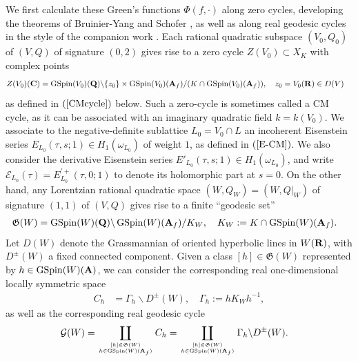 \documentclass{amsart}
\theoremstyle{definition}
\theoremstyle{definition}
\theoremstyle{definition}
\begin{document}
We first calculate these Green's functions $\Phi(f, \cdot)$ along zero cycles, developing the theorems of Bruinier-Yang \cite[Theorem 4.7]{BY} and Schofer \cite{Sch}, 
as well as along real geodesic cycles in the style of the companion work \cite{VO}. 
Each rational quadratic subspace $(V_0, Q_0)$ of $(V,Q)$ of signature $(0, 2)$ gives rise to a zero cycle $Z(V_0) \subset X_K$ with complex points
\begin{align*} Z(V_0)({\bf{C}}) &= \operatorname{GSpin}(V_0)({\bf{Q}}) \backslash \lbrace z_0 \rbrace \times
\operatorname{GSpin}(V_0)({\bf{A}}_f) / (K \cap \operatorname{GSpin}(V_0)({\bf{A}}_f)), \quad z_0 = V_0({\bf{R}}) \in D(V) \end{align*} 
as defined in $(\ref{CMcycle})$ below. Such a zero-cycle is sometimes called a CM cycle, as it can be associated with an imaginary quadratic field $k = k(V_0)$. 
We associate to the negative-definite sublattice $L_0 = V_0 \cap L$ an incoherent Eisenstein series $E_{L_0}(\tau, s; 1) \in H_1(\omega_{L_0})$ of weight $1$, as defined in $(\ref{E-CM})$. 
We also consider the derivative Eisenstein series $E'_{L_0}(\tau, s; 1) \in H_1(\omega_{L_0})$, and write
$\mathcal{E}_{L_0}(\tau) = E^{\prime +}_{L_0}(\tau, 0; 1)$ to denote its holomorphic part at $s=0$.
On the other hand, any Lorentzian rational quadratic space $(W, Q_W) = (W, Q\vert_W)$ of signature $(1,1)$ of $(V,Q)$ gives rise to a finite ``geodesic set'' 
\begin{align*} \mathfrak{G}(W) &= \operatorname{GSpin}(W)({\bf{Q}}) \backslash \operatorname{GSpin}(W)({\bf{A}}_f)/ K_W, \quad K_W :=K \cap \operatorname{GSpin}(W)({\bf{A}}_f). \end{align*}
Let $D(W)$ denote the Grassmannian of oriented hyperbolic lines in $W({\bf{R}})$, with $D^{\pm}(W)$ a fixed connected component.
Given a class $[h] \in \mathfrak{G}(W)$ represented by 
$h \in \operatorname{GSpin}(W)({\bf{A}})$, we can consider the corresponding real one-dimensional locally symmetric space
\begin{align*} C_h &= \Gamma_{h} \backslash D^{\pm}(W), \quad \Gamma_h := h K_W h^{-1}, \end{align*} %
as well as the corresponding real geodesic cycle 
\begin{align*} \mathcal{G}(W) &= \coprod\limits_{ [h] \in \mathfrak{G}(W) \atop h \in \operatorname{GSpin}(W)({\bf{A}}_f) } C_h 
= \coprod\limits_{ [h] \in \mathfrak{G}(W) \atop h \in \operatorname{GSpin}(W)({\bf{A}}_f) } \Gamma_h \backslash D^{\pm}(W). \end{align*}
\end{document}
